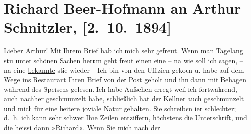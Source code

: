 

         
         \renewcommand{\erwaehntePersonen}{Personen: Hermann Bahr,  Guercino}
         \renewcommand{\erwaehnteInstitutionen}{Institutionen: Die Zeit. Wiener Wochenschrift}
         \renewcommand{\erwaehnteOrte}{Orte: Florenz, Mailand, Rom, Uffizien, Wien}
         \renewcommand{\erwaehnteWerke}{Werke: Die Verstoßung der Hagar}
               \section[Richard Beer-Hofmann an Arthur Schnitzler, {[}2. 10. 1894{]}]{ Richard Beer-Hofmann an Arthur Schnitzler, {[}2. 10. 1894{]}}\nopagebreak{}\rehead{ }\begin{ledgroupsized}[t]{13cm}\normalsize\beginnumbering \toendnotes[C]{\smallbreak\pagebreak[2]} 
\toendnotes[C]{\smallbreak}\pstart
           \noindent{}{\pb}Lieber Arthur! Mit Ihrem Brief hab ich mich sehr gefreut. Wenn man
               Tagelang stu{\geminationm} unter schönen Sachen herum geht freut
               einen eine – na wie soll ich sagen, – na eine \uline{bekannte} sti{\geminationm}e wieder –\pend
           \pstart
           Ich bin von den Uffizien geko{\geminationm}en u. habe auf dem Wege ins Restaurant {\pb}Ihren Brief von der Post geholt und
               ihn dann mit Behagen während des Speisens gelesen. Ich habe Aufsehen erregt weil ich
               fortwährend, auch nachher geschmunzelt habe, schließlich hat der Kellner auch
               geschmunzelt und mich für eine heitere joviale Natur gehalten.\pend
           \pstart
           Sie schreiben i{\geminationm}er schlechter; d. h. ich kann sehr
               schwer {\pb}Ihre Zeilen entziffern,
               höchstens die Unterschrift, und die heisst dann »Richard«. Wenn Sie mich nach der

\end{ledgroupsized}
